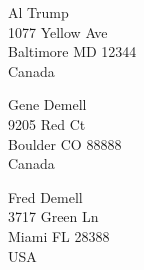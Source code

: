 \documentclass{article}
\begin{document}
\begin{center}
\begin{Huge}
\clearpage

\vspace*{\fill}
Al Trump\\
1077 Yellow Ave\\
Baltimore MD 12344\\
Canada
\vspace{\fill}

\clearpage

\vspace*{\fill}
Gene Demell\\
9205 Red Ct\\
Boulder CO 88888\\
Canada
\vspace{\fill}

\clearpage

\vspace*{\fill}
Fred Demell\\
3717 Green Ln\\
Miami FL 28388\\
USA
\vspace{\fill}

\clearpage

\end{Huge}
\end{center}
\end{document}
